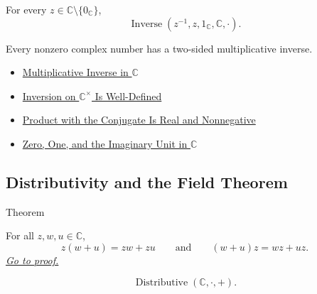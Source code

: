 \begin{remark*}
For every $z\in\mathbb{C}\setminus\{0_{\mathbb{C}}\}$,
\[
\operatorname{Inverse}(z^{-1},z,1_{\mathbb{C}},\mathbb{C},\cdot).
\]
\end{remark*}

\begin{remark*}[Interpretation]
Every nonzero complex number has a two-sided multiplicative inverse.
\end{remark*}

\begin{dependencies}
\begin{itemize}
  \item \hyperref[def:multiplicative-inverse-on-c]{Multiplicative Inverse in $\mathbb{C}$}
  \item \hyperref[thm:inversion-on-c-well-defined]{Inversion on $\mathbb{C}^{\times}$ Is Well-Defined}
  \item \hyperref[lem:complex-product-with-conjugate]{Product with the Conjugate Is Real and Nonnegative}
  \item \hyperref[def:zero-one-i-in-c]{Zero, One, and the Imaginary Unit in $\mathbb{C}$}
\end{itemize}
\end{dependencies}

\subsection*{Distributivity and the Field Theorem}

\begin{theorembox}{Theorem}
\begin{theorem}
\label{thm:multiplication-distributes-over-addition-on-c}
For all \(z,w,u\in\mathbb{C}\),
\[
z(w+u)=zw+zu
\qquad\text{and}\qquad
(w+u)z=wz+uz.
\]
\hyperref[prf:multiplication-distributes-over-addition-on-c]{\textit{Go to proof.}}
\end{theorem}
\end{theorembox}


\begin{remark*}
\[
\operatorname{Distributive}(\mathbb{C},\cdot,+).
\]
\end{remark*}

